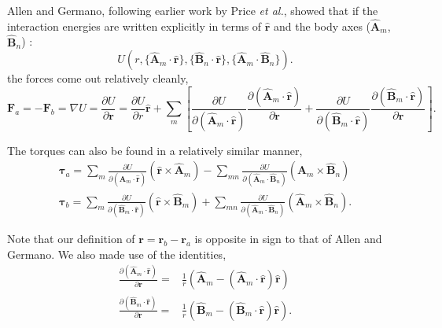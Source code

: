 Allen and Germano,\cite{Allen06} following earlier work by Price
{\em et al.},\cite{Price84} showed that if the interaction
energies are written explicitly in terms of $\hat{\mathbf{r}}$ and the body
axes ($\hat{\mathbf{A}}_m$, $\hat{\mathbf{B}}_n$) :
%
\begin{equation}
U(r, \{\hat{\mathbf{A}}_m \cdot \hat{\mathbf{r}} \}, 
\{\hat{\mathbf{B}}_n\cdot \hat{\mathbf{r}} \}, 
\{\hat{\mathbf{A}}_m \cdot \hat{\mathbf{B}}_n \}) .
\label{ugeneral}
\end{equation}
%
the forces come out relatively cleanly,
%
\begin{equation}
\mathbf{F}_a=-\mathbf{F}_b =  \nabla U =
\frac{\partial U}{\partial \mathbf{r}} 
= \frac{\partial U}{\partial r} \hat{\mathbf{r}} 
 + \sum_m \left[ 
\frac{\partial U}{\partial (\hat{\mathbf{A}}_m \cdot \hat{\mathbf{r}})} 
\frac { \partial (\hat{\mathbf{A}}_m \cdot \hat{\mathbf{r}})}{\partial \mathbf{r}} 
+ \frac{\partial U}{\partial (\hat{\mathbf{B}}_m \cdot \hat{\mathbf{r}})} 
\frac { \partial (\hat{\mathbf{B}}_m \cdot \hat{\mathbf{r}})}{\partial \mathbf{r}} 
\right] \label{forceequation}.
\end{equation}

The torques can also be found in a relatively similar
manner,
%
\begin{eqnarray}
\mathbf{\tau}_a =
 \sum_m 
\frac{\partial U}{\partial (\hat{\mathbf{A}}_m \cdot \hat{\mathbf{r}})} 
( \hat{\mathbf{r}} \times \hat{\mathbf{A}}_m )
-\sum_{mn}
\frac{\partial U}{\partial (\hat{\mathbf{A}}_m \cdot \hat{\mathbf{B}}_n)} 
(\hat{\mathbf{A}}_m \times \hat{\mathbf{B}}_n) \\
%
\mathbf{\tau}_b =
 \sum_m 
\frac{\partial U}{\partial (\hat{\mathbf{B}}_m \cdot \hat{\mathbf{r}})} 
( \hat{\mathbf{r}} \times \hat{\mathbf{B}}_m)
+\sum_{mn}
\frac{\partial U}{\partial (\hat{\mathbf{A}}_m \cdot \hat{\mathbf{B}}_n)} 
(\hat{\mathbf{A}}_m \times \hat{\mathbf{B}}_n) .
\end{eqnarray}

Note that our definition of $\mathbf{r}=\mathbf{r}_b - \mathbf{r}_a $
is opposite in sign to that of Allen and Germano.\cite{Allen06}
We also made use of the identities,
%
\begin{align}
\frac { \partial (\hat{\mathbf{A}}_m \cdot \hat{\mathbf{r}})}{\partial \mathbf{r}} 
=& \frac{1}{r} \left(  \hat{\mathbf{A}}_m - (\hat{\mathbf{A}}_m \cdot \hat{\mathbf{r}})\hat{\mathbf{r}}
\right) \\
\frac { \partial (\hat{\mathbf{B}}_m \cdot \hat{\mathbf{r}})}{\partial \mathbf{r}} 
=& \frac{1}{r} \left(  \hat{\mathbf{B}}_m - (\hat{\mathbf{B}}_m \cdot \hat{\mathbf{r}})\hat{\mathbf{r}} 
\right).
\end{align}

